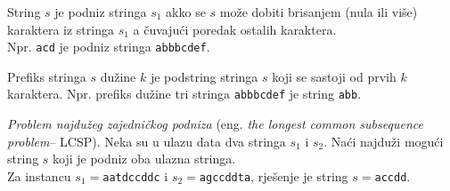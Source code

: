  \begin{definition}
 	String $s$ je podniz stringa $s_1$ akko se $s$ može dobiti brisanjem (nula ili više)
 	karaktera iz stringa $s_1$ a čuvajući poredak ostalih karaktera. \\
 	Npr.  \texttt{acd} je podniz stringa \texttt{abbbcdef}.   
 	
 	Prefiks stringa $s$ dužine $k$ je podstring stringa $s$ koji se sastoji od prvih $k$ karaktera. Npr. prefiks dužine tri stringa \texttt{abbbcdef} je string \texttt{abb}. 
 	
 \end{definition}
 
 \begin{example}
 	\textit{Problem najdužeg zajedničkog podniza} (eng. \textit{the longest common subsequence problem}-- LCSP).  Neka su u ulazu data dva stringa $s_1$ i $s_2$. Naći najduži mogući string $s$ koji je podniz oba ulazna stringa.  \\
 	
 	Za instancu $s_1=$\texttt{aatdccddc} i $s_2=$\texttt{agccddta}, rješenje je string $s=$\texttt{accdd}. 
 	
 \end{example}

